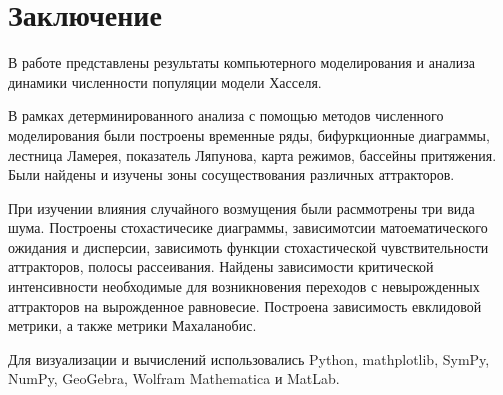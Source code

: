 \section{Заключение}

    В работе представлены результаты компьютерного моделирования и анализа динамики численности популяции модели Хасселя. 
    
    В рамках детерминированного анализа с помощью методов численного моделирования были построены временные ряды, бифуркционные диаграммы, лестница Ламерея, показатель Ляпунова, карта режимов, бассейны притяжения. Были найдены и изучены зоны сосуществования различных аттракторов. 

    При изучении влияния случайного возмущения были расммотрены три вида шума. Построены стохастичесике диаграммы, зависимотсии матоематического ожидания и дисперсии, зависимоть функции стохастической чувствительности аттракторов, полосы рассеивания. Найдены зависимости критической интенсивности необходимые для возникновения переходов с невырожденных аттракторов на вырожденное равновесие. Построена зависимость евклидовой метрики, а также метрики Махаланобис.

    Для визуализации и вычислений использовались Python, mathplotlib, SymPy, NumPy, GeoGebra, Wolfram Mathematica и MatLab.
